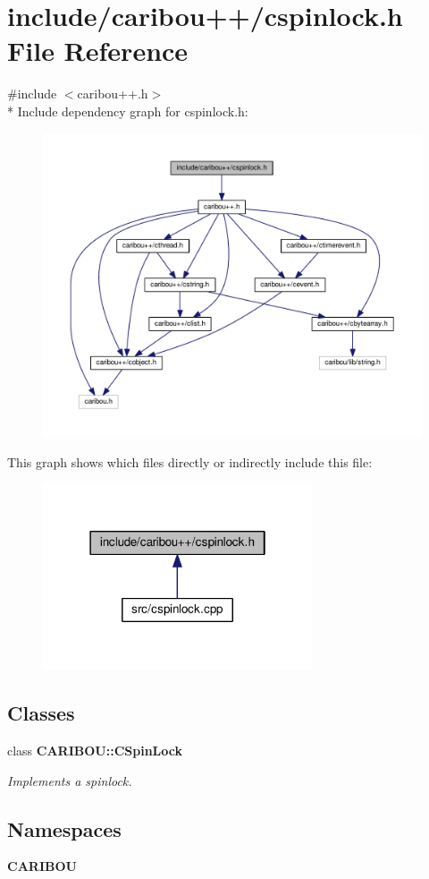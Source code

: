 \section{include/caribou++/cspinlock.h File Reference}
\label{cspinlock_8h}
{\ttfamily \#include $<$caribou++.\+h$>$}\\*
Include dependency graph for cspinlock.\+h\+:
\nopagebreak
\begin{figure}[H]
\begin{center}
\leavevmode
\includegraphics[width=350pt]{cspinlock_8h__incl}
\end{center}
\end{figure}
This graph shows which files directly or indirectly include this file\+:
\nopagebreak
\begin{figure}[H]
\begin{center}
\leavevmode
\includegraphics[width=226pt]{cspinlock_8h__dep__incl}
\end{center}
\end{figure}
\subsection*{Classes}
\begin{DoxyCompactItemize}
\item 
class {\bf C\+A\+R\+I\+B\+O\+U\+::\+C\+Spin\+Lock}
\begin{DoxyCompactList}\small\item\em Implements a spinlock. \end{DoxyCompactList}\end{DoxyCompactItemize}
\subsection*{Namespaces}
\begin{DoxyCompactItemize}
\item 
 {\bf C\+A\+R\+I\+B\+OU}
\end{DoxyCompactItemize}
